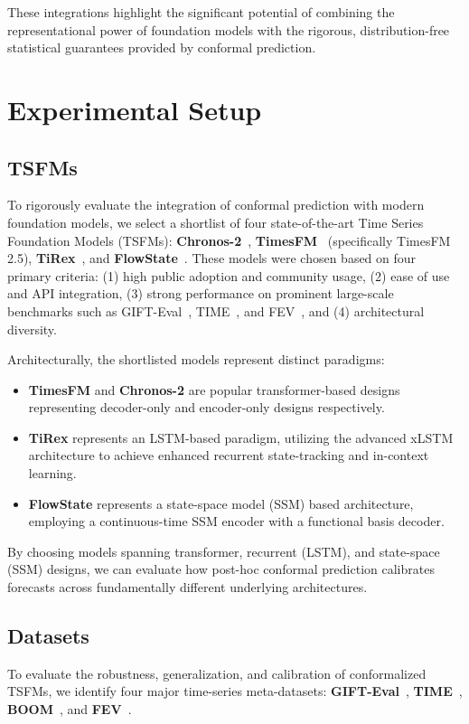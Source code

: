 \documentclass[12pt, a4paper]{article}
\begin{document}
These integrations highlight the significant potential of combining the representational power of foundation models with the rigorous, distribution-free statistical guarantees provided by conformal prediction.

\section{Experimental Setup}
\subsection{TSFMs}
To rigorously evaluate the integration of conformal prediction with modern foundation models, we select a shortlist of four state-of-the-art Time Series Foundation Models (TSFMs): \textbf{Chronos-2}~\cite{chronos2}, \textbf{TimesFM}~\cite{timesfm} (specifically TimesFM 2.5), \textbf{TiRex}~\cite{tirex}, and \textbf{FlowState}~\cite{flowstate}. These models were chosen based on four primary criteria: (1) high public adoption and community usage, (2) ease of use and API integration, (3) strong performance on prominent large-scale benchmarks such as GIFT-Eval~\cite{gift-eval}, TIME~\cite{time}, and FEV~\cite{fev-bench}, and (4) architectural diversity.

Architecturally, the shortlisted models represent distinct paradigms:
\begin{itemize}
	\item \textbf{TimesFM} and \textbf{Chronos-2} are popular transformer-based designs representing decoder-only and encoder-only designs respectively.
	\item \textbf{TiRex} represents an LSTM-based paradigm, utilizing the advanced xLSTM architecture to achieve enhanced recurrent state-tracking and in-context learning.
	\item \textbf{FlowState} represents a state-space model (SSM) based architecture, employing a continuous-time SSM encoder with a functional basis decoder.
\end{itemize}
By choosing models spanning transformer, recurrent (LSTM), and state-space (SSM) designs, we can evaluate how post-hoc conformal prediction calibrates forecasts across fundamentally different underlying architectures.

\subsection{Datasets}
To evaluate the robustness, generalization, and calibration of conformalized TSFMs, we identify four major time-series meta-datasets: \textbf{GIFT-Eval}~\cite{gift-eval}, \textbf{TIME}~\cite{time}, \textbf{BOOM}~\cite{toto}, and \textbf{FEV}~\cite{fev-bench}.
\end{document}
